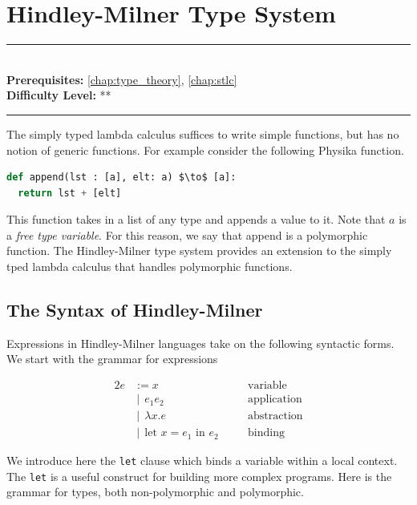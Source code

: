 \documentclass[book.tex]{subfiles}
\begin{document}
\chapter{Hindley-Milner Type System}

\label{chap:hindley_milner}
\noindent\rule{11cm}{0.4pt} \\
\textbf{Prerequisites:}  \autoref{chap:type_theory}, \autoref{chap:stlc}   \\
\textbf{Difficulty Level:} ** \\
\noindent\rule{11cm}{0.4pt}
\vspace{5mm}

The simply typed lambda calculus suffices to write simple functions, but has no notion of generic functions. For example consider the following Physika function.

\begin{lstlisting}[language=python]
def append(lst : [a], elt: a) $\to$ [a]:
  return lst + [elt]
\end{lstlisting}

This function takes in a list of any type and appends a value to it. Note that $a$ is a \textit{free type variable}. For this reason, we say that append is a polymorphic function. The Hindley-Milner type system provides an extension to the simply tped lambda calculus that handles polymorphic functions. 

\section{The Syntax of Hindley-Milner}

Expressions in Hindley-Milner languages take on the following syntactic forms. We start with the grammar for expressions 

\begin{alignat*}{2}
    e &:= x \quad &&\textrm{variable} \\
    &\ |\ \ e_1 e_2 \quad &&\textrm{application} \\
    &\ |\ \ \lambda x . e \quad &&\textrm{abstraction} \\
    &\ |\ \ \textrm{let } x = e_1\textrm{ in }e_2 \quad &&\textrm{binding}
\end{alignat*}

We introduce here the \lstinline{let} clause which binds a variable within a local context. The \lstinline{let} is a useful construct for building more complex programs. Here is the grammar for types, both non-polymorphic and polymorphic.
\end{document}
